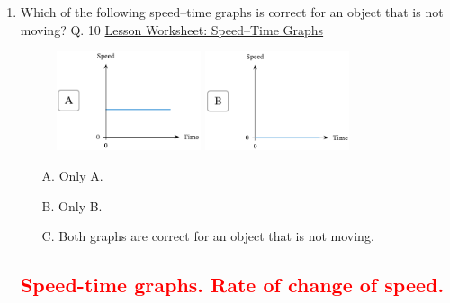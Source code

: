 \documentclass[A4,12pt]{article}
\begin{document}
\begin{enumerate}[label=\bfseries (\arabic*)]
\item Which of the following speed–time graphs is correct for an object that is not moving? \cite{Nagwa} Q. 10 \href{https://www.nagwa.com/en/worksheets/257191315239/}{Lesson Worksheet: Speed–Time Graphs}
%
\begin{figure}[H]
    \centering
    \includegraphics[width=0.4\textwidth]{Nagwa_Q10_Speedt-1.png} \hfill
    \includegraphics[width=0.4\textwidth]{Nagwa_Q10_Speedt-2.png}
\end{figure}
%
\begin{itemize}
    \item[A.] Only A.
    \item[B.] Only B.
    \item[C.] Both graphs are correct for an object that is not moving.
\end{itemize}


\subsection*{\textcolor{red}{Speed-time graphs. Rate of change of speed.}}






\end{enumerate}
\end{document}
